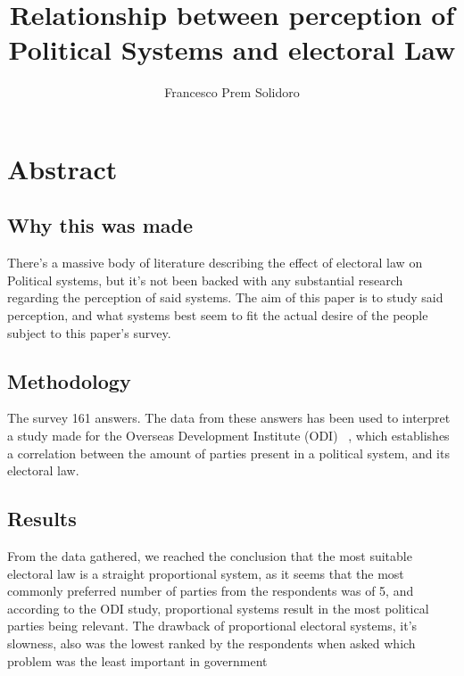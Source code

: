 \documentclass{article}
\title{Relationship between perception of Political Systems and electoral Law}
\author{Francesco Prem Solidoro}
\begin{document}
\maketitle
\section{Abstract} %
\label{sec:Abstract}
\subsection{Why this was made} %
\label{sub:Reason why this was made}

There's a massive body of literature describing the effect of electoral law on Political systems, but it's not been backed with any substantial research regarding the perception of said systems. The aim of this paper is to study said perception, and what systems best seem to fit the actual desire of the people subject to this paper's survey.

\subsection{Methodology} %
\label{sec:Methodology}
The survey 161 answers. The data from these answers has been used to interpret a study made for the Overseas Development Institute (ODI) ~\cite{ODI-electoral-systems}, which establishes a correlation between the amount of parties present in a political system, and its electoral law.


\subsection{Results}
From the data gathered, we reached the conclusion that the most suitable electoral law is a straight proportional system, as it seems that the most commonly preferred number of parties from the respondents was of 5, and according to the ODI study, proportional systems result in the most political parties being relevant. The drawback of proportional electoral systems, it's slowness, also was the lowest ranked by the respondents when asked which problem was the least important in government

\newpage
\end{document}
